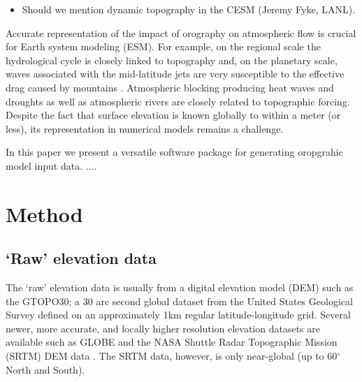 \documentclass[gmd]{copernicus}
\begin{document}
\begin{itemize}
\item Should we mention dynamic topography in the CESM (Jeremy Fyke, LANL).
\end{itemize}

Accurate representation of the impact of orography on atmospheric flow is crucial for Earth system modeling (ESM).  For example, on the regional scale the hydrological cycle is closely linked to topography and, on the planetary scale, waves associated with the mid-latitude jets are very susceptible to the effective drag caused by mountains \citep[e.g., ][]{LM1997QJRMS}. Atmospheric blocking producing heat waves and droughts as well as atmospheric rivers are closely related to topographic forcing. Despite the fact that surface elevation is known globally to within a meter (or less), its representation in numerical models remains a challenge.


In this paper we present a versatile software package for generating oropgrahic model input data. ....

\section{Method}
\subsection{`Raw' elevation data}
The `raw' elevation data is usually from a digital elevation model (DEM) such as the GTOPO30; a 30 arc second global dataset from the United States Geological Survey \citep[USGS; ][]{USGS} defined on an approximately 1km regular latitude-longitude grid. Several newer, more accurate, and locally higher resolution elevation datasets are available such as GLOBE \citep{GLOBE} and the NASA Shuttle Radar Topographic Mission (SRTM) DEM data \citep{SRTM}. The SRTM data, however, is only near-global (up to 60$^\circ$ North and South).%
\end{document}
